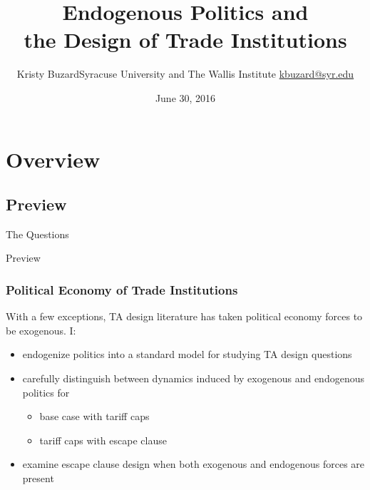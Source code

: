 \documentclass{beamer}
\title[Endogenous Politics and the Design of Trade Institutions\hspace{2.05in}\insertframenumber/\inserttotalframenumber]{Endogenous Politics and \\ the Design of Trade Institutions}
\author[Kristy Buzard]{\texorpdfstring{Kristy Buzard\newline Syracuse University and The Wallis Institute  \newline\url{kbuzard@syr.edu}}{Kristy Buzard}}
\date{June 30, 2016}
\begin{document}
\maketitle




\section{Overview}
\subsection{Preview}
\begin{frame}{The Questions}

\pause
{}

\end{frame}


\begin{frame}{Preview}
\frametitle{Political Economy of Trade Institutions}
\pause
With a few exceptions, TA design literature has taken political economy forces to be exogenous. I:
\pause
\begin{itemize}[<+->]
	\item endogenize politics into a standard model for studying TA design questions
	\item carefully distinguish between dynamics induced by exogenous and endogenous politics for
		\begin{itemize}[<+->]
			\item base case with tariff caps
			\item tariff caps with escape clause
		\end{itemize}
	\item examine escape clause design when both exogenous and endogenous forces are present
\end{itemize}
\end{frame}
\end{document}
